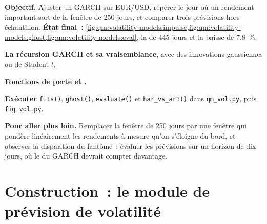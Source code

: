 \begin{tutorial}
\textbf{Objectif.} Ajuster un GARCH sur EUR/USD, repérer le jour où un rendement important sort de la fenêtre de 250 jours, et comparer trois prévisions hors échantillon.
\textbf{État final~:} \cref{fig:qm:volatility-models:impulse,fig:qm:volatility-models:ghost,fig:qm:volatility-models:eval}, la  de 445 jours et la baisse
de 7.8~\%.
\begin{tutsteps}
\item \textbf{La récursion GARCH et sa vraisemblance}, avec des innovations gaussiennes ou de Student-$t$.
\label{lst:qm:volatility-models:filter}
\item \textbf{Fonctions de perte et .}
\label{lst:qm:volatility-models:dm}
\item \textbf{Exécuter} \texttt{fits()}, \texttt{ghost()}, \texttt{evaluate()} et \texttt{har\_vs\_ar1()} dans \texttt{qm\_vol.py}, puis \texttt{fig\_vol.py}.
\end{tutsteps}
\textbf{Pour aller plus loin.} Remplacer la fenêtre de 250 jours par une fenêtre qui pondère linéairement les rendements à mesure qu'on s'éloigne du bord, et observer la disparition du fantôme~; évaluer les prévisions
sur un horizon de dix jours, où le  du GARCH devrait compter davantage.
\end{tutorial}

\section{Construction~: le module de prévision de volatilité}\label{bld:qm:volatility-models:volfcst}

